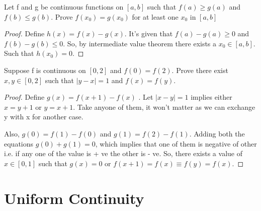 \documentclass{notes}
\begin{document}


\begin{problem}
	Let f and g be continuous functions on $[a, b]$ such that $f(a) \geq
	g(a)$ and $f(b) \leq g(b)$. Prove $f(x_0) = g(x_0)$ for at least one $x_0$ in
	$[a, b]$
\end{problem}
\begin{proof}
	Define $h(x) = f(x)-g(x)$. It's given that $f(a) - g(a)\geq 0$ and $f(b) - g(b)\leq 0$. So, by intermediate value theorem there exists a $x_0 \in [a,b]$. Such that $h(x_0) = 0$.
	
\end{proof}
\begin{problem}
	Suppose f is continuous on $[0, 2]$ and $f(0) = f(2)$. Prove there exist
	$x, y \in [0, 2]$ such that $|y - x| = 1$ and $f(x) = f(y)$.
\end{problem}
\begin{proof}
	Define $g(x) = f(x+1) - f(x)$ . Let $|x-y| = 1$ implies either $x = y+1$ or $y = x+1$. 
	Take anyone of them, it won't matter as we can exchange y with x for another case. 
	
	Also, $ g(0) = f(1)-f(0)$ and $g(1) = f(2)-f(1)$. Adding both the equations $g(0)+g(1) = 0$, which implies that one of them is negative of other i.e. if any one of the value is + ve  the other is - ve.
	So, there exists a value of $x \in [0,1]$ such that $g(x) = 0$ or $f(x+1) = f(x) \equiv f(y) = f(x)$.
\end{proof}
\section{Uniform Continuity}
\end{document}
